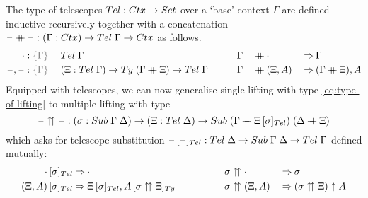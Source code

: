 \documentclass[a4paper,UKenglish,numberwithinsect,cleveref,thm-restate]{lipics-v2021}
\begin{document}
The type of telescopes $\Tel : \Ctx \to \Set$ over a `base' context $\Gamma$ are defined inductive-recursively together with a concatenation $\blank \dplus\blank : (\Gamma : \Ctx) \to \Tel\;\Gamma \to \Ctx$ as follows.
\begin{alignat*}{9}
  \emptytel          & : \implicit{\Gamma}\; && \Tel\;\Gamma \qquad 
                     && \Gamma && \dplus \emptytel && \reduce \Gamma \\
  \blank,\blank      & : \implicit{\Gamma}\; && (\Xi : \Tel\;\Gamma) \to \Ty\;(\Gamma \dplus \Xi) \to \Tel\;\Gamma\qquad
                     && \Gamma && \dplus (\Xi, A)  && \reduce (\Gamma \dplus \Xi) , A
\end{alignat*}
Equipped with telescopes, we can now generalise single lifting with type \eqref{eq:type-of-lifting} to multiple lifting with type
\[
\blank\upuparrows \blank : (\sigma : \Sub\;\Gamma\;\Delta) \to (\Xi : \Tel\;\Delta)
\to \Sub\;(\Gamma \dplus \subTel{\Xi}{\sigma})\;(\Delta \dplus \Xi)
\]
which asks for telescope substitution $\subTel{\blank}{\blank} :  \Tel\;\Delta \to \Sub\;\Gamma\;\Delta \to \Tel\;\Gamma$ defined mutually:
\begin{alignat*}{9}
  \subTel{\emptytel}{\sigma} & {} \reduce \emptytel \qquad
                             && \sigma \upuparrows \emptytel && \reduce \sigma \\
  \subTel{(\Xi, A)}{\sigma}  & {} \reduce \subTel{\Xi}{\sigma}, \subTy{A}{\sigma \upuparrows \Xi} \qquad\qquad
                             && \sigma \upuparrows (\Xi, A)  && \reduce (\sigma \upuparrows \Xi) \uparrow A
\end{alignat*}
\end{document}
